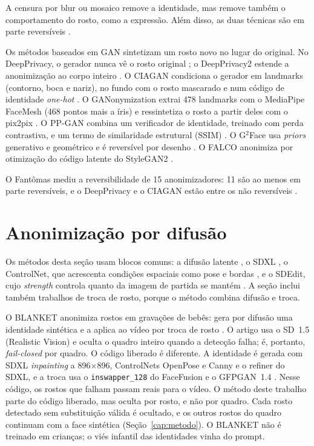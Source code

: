 A censura por blur ou mosaico remove a identidade, mas remove também o comportamento do rosto, como a expressão.
Além disso, as duas técnicas são em parte reversíveis \citep{fantomas}.

Os métodos baseados em GAN sintetizam um rosto novo no lugar do original.
No DeepPrivacy, o gerador nunca vê o rosto original \citep{deepprivacy}; o DeepPrivacy2 estende a anonimização ao corpo inteiro \citep{deeprivacy2}.
O CIAGAN condiciona o gerador em landmarks (contorno, boca e nariz), no fundo com o rosto mascarado e num código de identidade \emph{one-hot} \citep{ciagan}.
O GANonymization extrai 478 landmarks com o MediaPipe FaceMesh (468 pontos mais a íris) e ressintetiza o rosto a partir deles com o pix2pix \citep{hellmann,facemesh,pix2pix}.
O PP-GAN combina um verificador de identidade, treinado com perda contrastiva, e um termo de similaridade estrutural (SSIM) \citep{yifan-wu}.
O G$^2$Face usa \emph{priors} generativo e geométrico e é reversível por desenho \citep{h-yang}.
O FALCO anonimiza por otimização do código latente do StyleGAN2 \citep{falco}.

O Fantômas mediu a reversibilidade de 15 anonimizadores: 11 são ao menos em parte reversíveis, e o DeepPrivacy e o CIAGAN estão entre os não reversíveis \citep{fantomas}.

\section{Anonimização por difusão}

Os métodos desta seção usam blocos comuns: a difusão latente \citep{ldm}, o SDXL \citep{sdxl}, o ControlNet, que acrescenta condições espaciais como pose e bordas \citep{controlnet}, e o SDEdit, cujo \emph{strength} controla quanto da imagem de partida se mantém \citep{sdedit}.
A seção inclui também trabalhos de troca de rosto, porque o método combina difusão e troca.

O BLANKET anonimiza rostos em gravações de bebês: gera por difusão uma identidade sintética e a aplica ao vídeo por troca de rosto \citep{blanket}.
O artigo usa o SD~1.5 (Realistic Vision) e oculta o quadro inteiro quando a detecção falha; é, portanto, \emph{fail-closed} por quadro.
O código liberado é diferente.
A identidade é gerada com SDXL \emph{inpainting} a 896$\times$896, ControlNets OpenPose e Canny e o refiner do SDXL, e a troca usa o \texttt{inswapper\_128} do FaceFusion e o GFPGAN~1.4 \citep{facefusion,gfpgan}.
Nesse código, os rostos que falham passam reais para o vídeo.
O método deste trabalho parte do código liberado, mas oculta por rosto, e não por quadro.
Cada rosto detectado sem substituição válida é ocultado, e os outros rostos do quadro continuam com a face sintética (Seção~\ref{cap:metodo}).
O BLANKET não é treinado em crianças; o viés infantil das identidades vinha do prompt.

